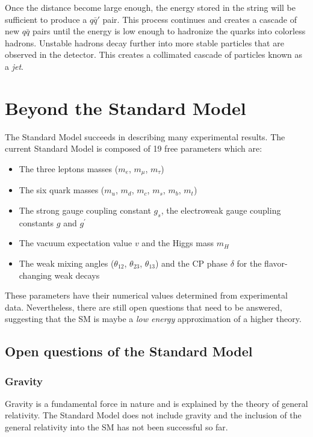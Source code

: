 Once the distance become large enough, the energy stored in the string will be sufficient to produce a $q\bar{q}'$ pair. This process continues and creates a cascade of new $q\bar{q}$ pairs until the energy is low enough to hadronize the quarks into colorless hadrons. Unstable hadrons decay further into more stable particles that are observed in the detector. This creates a collimated cascade of particles known as a \textit{jet}.

\section{Beyond the Standard Model}
\label{sec:BeyondSM}

The Standard Model succeeds in describing many experimental results. The current Standard Model is composed of 19 free parameters which are:

\begin{itemize}
  \item The three leptons masses ($m_e$, $m_{\mu}$, $m_{\tau}$)
  \item The six quark masses ($m_u$, $m_d$, $m_c$, $m_s$, $m_b$, $m_t$)
  \item The strong gauge coupling constant $g_s$, the electroweak gauge coupling constants $g$ and $g^{\prime}$
  \item The vacuum expectation value $v$ and the Higgs mass $m_H$
  \item The weak mixing angles ($\theta_{12}$, $\theta_{23}$, $\theta_{13}$) and the CP phase $\delta$ for the flavor-changing weak decays \cite{Kobayashi:1973pt}
\end{itemize}

These parameters have their numerical values determined from experimental data. Nevertheless, there are still open questions that need to be answered, suggesting that the SM is maybe a \textit{low energy} approximation of a higher theory.

\subsection{Open questions of the Standard Model}

\subsubsection*{Gravity}

Gravity is a fundamental force in nature and is explained by the theory of general relativity. The Standard Model does not include gravity and the inclusion of the general relativity into the SM has not been successful so far.

